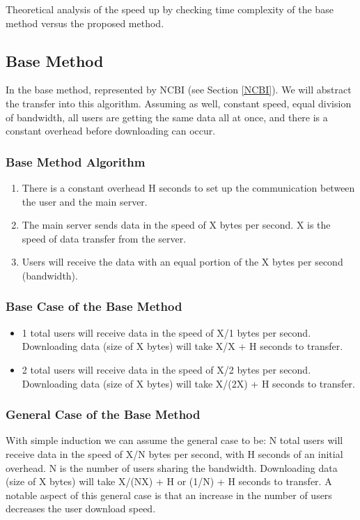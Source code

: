 \documentclass[acmsmall]{acmart}
\begin{document}
Theoretical analysis of the speed up by checking time complexity of the base method versus the proposed method.

\subsection{Base Method}
In the base method, represented by NCBI (see Section \ref{NCBI}). We will abstract the transfer into this algorithm. Assuming as well, constant speed, equal division of bandwidth, all users are getting the same data all at once, and there is a constant overhead before downloading can occur.

\subsubsection{Base Method Algorithm}
\begin{enumerate}
    \item There is a constant overhead H seconds to set up the communication between the user and the main server.
    \item The main server sends data in the speed of X bytes per second. X is the speed of data transfer from the server.
    \item Users will receive the data with an equal portion of the X bytes per second (bandwidth).
\end{enumerate}

\subsubsection{Base Case of the Base Method}
    \begin{itemize} 
        \item 1 total users will receive data in the speed of X/1 bytes per second. Downloading data (size of X bytes) will take X/X + H seconds to transfer.
        \item 2 total users will receive data in the speed of X/2 bytes per second. Downloading data (size of X bytes) will take X/(2X) + H seconds to transfer.
    \end{itemize}

\subsubsection{General Case of the Base Method} 
With simple induction we can assume the general case to be: N total users will receive data in the speed of X/N bytes per second, with H seconds of an initial overhead. N is the number of users sharing the bandwidth. Downloading data (size of X bytes) will take X/(NX) + H or (1/N) + H seconds to transfer. A notable aspect of this general case is that an increase in the number of users decreases the user download speed.
\end{document}
